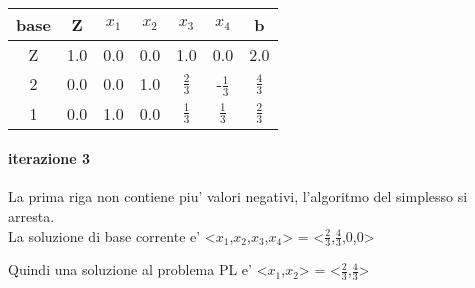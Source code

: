 \begin{center}
	\begin{tabular}{|c|c|c|c|c|c|c|}
		\hline
		base & Z & $x_1$ & $x_2$ & $x_3$ & $x_4$ & b\\
		\hline
		Z & 1.0 & 0.0 & 0.0 & 1.0 & 0.0 & 2.0\\
		2 & 0.0 & 0.0 & 1.0 & $\frac 2 3$ & -$\frac 1 3$ & $\frac 4 3$\\
		1 & 0.0 & 1.0 & 0.0 & $\frac 1 3$ & $\frac 1 3$ & $\frac 2 3$\\
		\hline
	\end{tabular}
\end{center}

\paragraph{iterazione 3}

La prima riga non contiene piu' valori negativi, l'algoritmo del simplesso si arresta. \\

La soluzione di base corrente e' <$x_1$,$x_2$,$x_3$,$x_4$> = <$\frac 2 3$,$\frac 4 3$,0,0>\*

Quindi una soluzione al problema PL e' <$x_1$,$x_2$> = <$\frac 2 3$,$\frac 4 3$>\*
